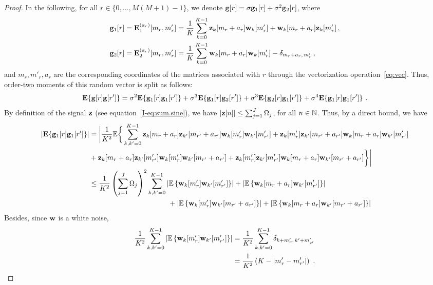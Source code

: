 \documentclass[journal,onecolumn]{IEEEtran}
\begin{document}
\begin{proof}
In the following, for all $r\in\{0,\ldots,M(M+1)-1\}$, we denote ${\mathbf g}[r] = \sigma{\mathbf g}_1[r] + \sigma^2{\mathbf g}_2[r]$, where 
\begin{align*}
{\mathbf g}_1[r] &= {\mathbf E}_1^{(a_r)}[m_r,m'_r] = \dfrac1K\sum_{k=0}^{K-1} {\mathbf z}_k[m_r+a_r]{\mathbf w}_k[m'_r] + {\mathbf w}_k[m_r+a_r]{\mathbf z}_k[m'_r]\,, \\
{\mathbf g}_2[r] &= {\mathbf E}_2^{(a_r)}[m_r,m'_r] = \dfrac1K\sum_{k=0}^{K-1} {\mathbf w}_k[m_r+a_r]{\mathbf w}_k[m'_r] - \delta_{m_r+a_r,\,m'_r} \,,
\end{align*}
and $m_r,m'_r, a_r$ are the corresponding coordinates of the matrices associated with $r$ through the vectorization operation~\eqref{eq:vec}. Thus, order-two moments of this random vector is split as follows:
\begin{equation}
\bE\{\bg[r]\bg[r']\} = \sigma^2\bE\{\bg_1[r]\bg_1[r']\} + \sigma^3\bE\{\bg_1[r]\bg_2[r']\} + \sigma^3\bE\{\bg_2[r]\bg_1[r']\} + \sigma^4\bE\{\bg_1[r]\bg_1[r']\}\ .
\label{eq:gg}
\end{equation}
By definition of the signal ${\mathbf z}$ (see equation~\eqref{I-eq:sum.sine}), we have $|{\mathbf z}[n]|\leq\sum_{j=1}^J\Omega_j$, for all $n\in\mathbb N$. Thus, by a direct bound, we have
\begin{align}
\nonumber
\left|\bE\{\bg_1[r]\bg_1[r']\}\right| & = \bigg|\dfrac1{K^2}\EE\bigg\{\sum_{k,k'=0}^{K-1} \bz_k[m_r+a_r]\bz_{k'}[m_{r'}+a_{r'}]\bw_k[m'_r]\bw_{k'}[m'_{r'}] + \bz_k[m'_r]\bz_{k'}[m_{r'}+a_{r'}]\bw_k[m_r+a_r]\bw_{k'}[m'_{r'}] \\
\nonumber
&+ \bz_k[m_r+a_r]\bz_{k'}[m'_{r'}]\bw_k[m'_r]\bw_{k'}[m_{r'}+a_{r'}] + \bz_k[m'_r]\bz_{k'}[m'_{r'}]\bw_k[m_r+a_r]\bw_{k'}[m_{r'}+a_{r'}]\bigg\} \bigg| \\
\nonumber
& \leq \dfrac1{K^2}\left(\sum_{j=1}^J \Omega_j\right)^2 \sum_{k,k'=0}^{K-1} \left|\EE\left\{\bw_k[m'_r]\bw_{k'}[m'_{r'}]\right\}\right| + \left|\EE\left\{\bw_k[m_r+a_r]\bw_{k'}[m'_{r'}]\right\}\right|  \\
&\hspace{110pt}  + \left|\EE\left\{\bw_k[m'_r]\bw_{k'}[m_{r'}+a_{r'}]\right\}\right| + \left|\EE\left\{\bw_k[m_r+a_r]\bw_{k'}[m_{r'}+a_{r'}]\right\}\right|
\label{eq:sum.g1g1}
\end{align}
Besides, since ${\mathbf w}$ is a white noise,
\begin{align*}
\dfrac1{K^2}\sum_{k,k'=0}^{K-1} \left|\EE\left\{\bw_k[m'_r]\bw_{k'}[m'_{r'}]\right\}\right| & = \dfrac1{K^2}\sum_{k,k'=0}^{K-1} \delta_{k+m'_r,\,k'+m'_{r'}}  \\
&= \dfrac1{K^2}\left(K-\left|m'_r-m'_{r'}\right|\right) \ .

\end{align*}
\end{proof}
\end{document}
